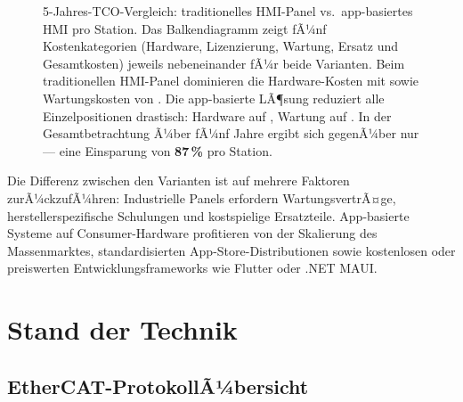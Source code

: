﻿\documentclass[12pt,a4paper]{article}
\begin{document}
\begin{figure}[H]
\centering
{}
\caption{5-Jahres-TCO-Vergleich: traditionelles HMI-Panel vs.\ app-basiertes HMI pro
  Station. Das Balkendiagramm zeigt fÃ¼nf Kostenkategorien (Hardware, Lizenzierung,
  Wartung, Ersatz und Gesamtkosten) jeweils nebeneinander fÃ¼r beide Varianten. Beim
  traditionellen HMI-Panel dominieren die Hardware-Kosten mit  sowie
  Wartungskosten von . Die app-basierte LÃ¶sung reduziert alle
  Einzelpositionen drastisch: Hardware auf , Wartung auf . In der
  Gesamtbetrachtung Ã¼ber fÃ¼nf Jahre ergibt sich  gegenÃ¼ber nur 
  --- eine Einsparung von \textbf{87\,\%} pro Station.}
\label{fig:cost_comparison}
\end{figure}

Die Differenz zwischen den Varianten ist auf mehrere Faktoren zurÃ¼ckzufÃ¼hren: Industrielle
Panels erfordern WartungsvertrÃ¤ge, herstellerspezifische Schulungen und kostspielige
Ersatzteile. App-basierte Systeme auf Consumer-Hardware profitieren von der Skalierung
des Massenmarktes, standardisierten App-Store-Distributionen sowie kostenlosen oder
preiswerten Entwicklungsframeworks wie Flutter oder .NET MAUI.

\section{Stand der Technik}
\label{sec:sota}

\subsection{EtherCAT-ProtokollÃ¼bersicht}
\end{document}
